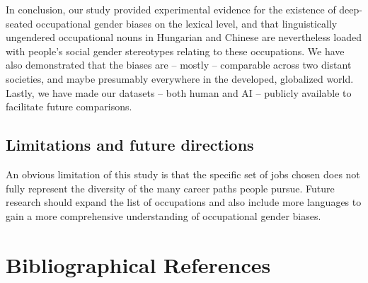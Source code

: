 \documentclass[10pt, a4paper]{article}
\begin{document}
In conclusion, our study provided experimental evidence for the existence of deep-seated occupational gender biases on the lexical level, and that linguistically ungendered occupational nouns in Hungarian and Chinese are nevertheless loaded with people's social gender stereotypes relating to these occupations. We have also demonstrated that the biases are -- mostly -- comparable across two distant societies, and maybe presumably everywhere in the developed, globalized world. Lastly, we have made our datasets -- both human and AI -- publicly available to facilitate future comparisons.

\subsection{Limitations and future directions}

An obvious limitation of this study is that the specific set of jobs chosen does not fully represent the diversity of the many career paths people pursue. Future research should expand the list of occupations and also include more languages to gain a more comprehensive understanding of occupational gender biases. 



\section{Bibliographical References}\label{sec:reference}







\end{document}
